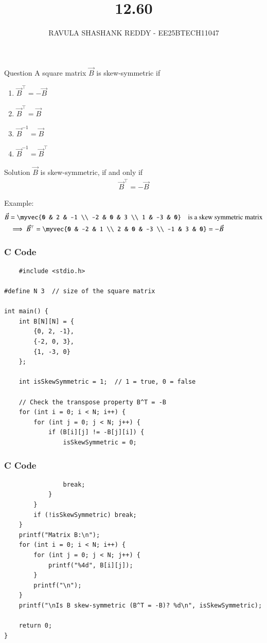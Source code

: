 \documentclass{beamer}
\title %
{12.60}
\author %
{RAVULA SHASHANK REDDY - EE25BTECH11047}
\begin{document}
	
	
	\frame{\titlepage}
	\begin{frame}{Question}
     A square matrix $\vec{B}$ is skew-symmetric if 
\begin{enumerate}
    \item  $\vec{B}^\top = -\vec{B}$ 
    \item  $\vec{B}^\top = \vec{B}$ 
    \item  $\vec{B}^{-1} = \vec{B}$ 
    \item  $\vec{B}^{-1} = \vec{B}^\top$ 
\end{enumerate}
\end{frame}
\begin{frame}{Solution}
    $\vec{B}$ is  skew-symmetric, if and only if 
 \begin{align}
     \vec{B}^\top = -\vec{B}
 \end{align}

Example: 
\begin{align}
\vec{B} &= \myvec{0 & 2 & -1 \\ -2 & 0 & 3 \\ 1 & -3 & 0} \quad \text{is a skew symmetric matrix}\\
&\implies \vec{B}^\top = \myvec{0 & -2 & 1 \\ 2 & 0 & -3 \\ -1 & 3 & 0} = -\vec{B}
\end{align}
\end{frame}
\begin{frame}[fragile]
\frametitle{C Code}
\begin{lstlisting}
    #include <stdio.h>

#define N 3  // size of the square matrix

int main() {
    int B[N][N] = {
        {0, 2, -1},
        {-2, 0, 3},
        {1, -3, 0}
    };
    
    int isSkewSymmetric = 1;  // 1 = true, 0 = false

    // Check the transpose property B^T = -B
    for (int i = 0; i < N; i++) {
        for (int j = 0; j < N; j++) {
            if (B[i][j] != -B[j][i]) {
                isSkewSymmetric = 0;
                \end{lstlisting}
                \end{frame}
\begin{frame}[fragile]
\frametitle{C Code}
\begin{lstlisting}
                break;
            }
        }
        if (!isSkewSymmetric) break;
    }
    printf("Matrix B:\n");
    for (int i = 0; i < N; i++) {
        for (int j = 0; j < N; j++) {
            printf("%4d", B[i][j]);
        }
        printf("\n");
    }
    printf("\nIs B skew-symmetric (B^T = -B)? %d\n", isSkewSymmetric);

    return 0;
}
\end{lstlisting}
\end{frame}
\end{document}
